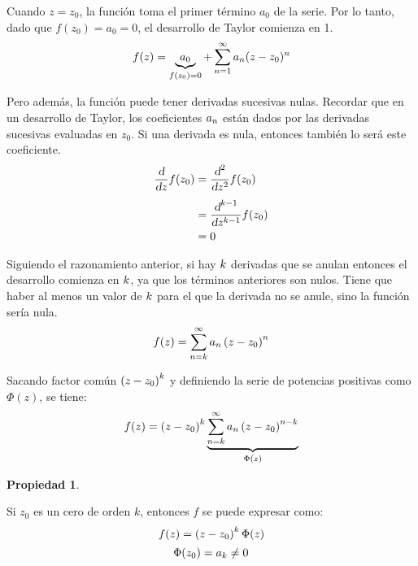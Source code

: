 \documentclass[a5paper,12pt,twoside]{book}
\newtheorem{prop}{{Propiedad}}[chapter]
\begin{document}
Cuando $z=z_0$, la función toma el primer término $a_0$ de la serie.
Por lo tanto, dado que $f(z_0) = a_0 = 0$, el desarrollo de Taylor comienza en 1.
\begin{equation*}
    f(z) = \underbrace{a_0}_{f(z_0)=0} + \sum_{n=1}^\infty a_n (z-z_0)^n
\end{equation*}

Pero además, la función puede tener derivadas sucesivas nulas.
Recordar que en un desarrollo de Taylor, los coeficientes $a_n$ están dados por las derivadas sucesivas evaluadas en $z_0$.
Si una derivada es nula, entonces también lo será este coeficiente.
\begin{align*}
    \frac{\textsl{d}}{\textsl{d} z} f(z_0) &= \frac{\textsl{d}^2}{\textsl{d} z^2} f(z_0)
    \\[1ex]
    &= \frac{\textsl{d}^{k-1}}{\textsl{d} z^{k-1}} f(z_0)
    \\
    &= 0
\end{align*}

Siguiendo el razonamiento anterior, si hay $k$ derivadas que se anulan entonces el desarrollo comienza en $k$, ya que los términos anteriores son nulos.
Tiene que haber al menos un valor de $k$ para el que la derivada no se anule, sino la función sería nula.
\begin{equation*}
    f(z) = \sum_{n=k}^\infty a_n \left(z-z_0\right)^n
\end{equation*}

Sacando factor común $\left(z-z_0\right)^k$ y definiendo la serie de potencias positivas como $\Phi(z)$, se tiene:
\begin{equation*}
    f(z) = \left(z-z_0\right)^k \underbrace{\sum_{n=k}^\infty a_n \left(z-z_0\right)^{n-k}}_{\Phi (z)}
\end{equation*}

\begin{mdframed}[style=PropertyFrame]
    \begin{prop}
    \end{prop}
    Si $z_0$ es un cero de orden $k$, entonces $f$ se puede expresar como:
    \begin{equation*}
        f(z) = \left(z-z_0\right)^k \Phi (z)
    \end{equation*}
    \begin{equation*}
        \Phi (z_0) = a_k \neq 0
    \end{equation*}
\end{mdframed}
\end{document}
